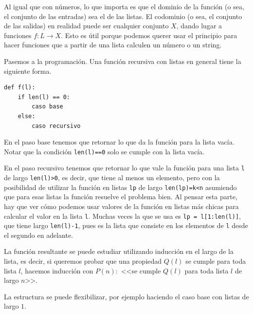 \documentclass[a4paper, 12pt]{report}
\theoremstyle{definition}
\begin{document}
Al igual que con números, lo que importa es que el dominio de la función (o sea, el conjunto de las entradas) sea el de las listas. El codominio (o sea, el conjunto de las salidas) en realidad puede ser cualquier conjunto $X$, dando lugar a funciones $f:L\to X$. Esto es útil porque podemos querer usar el principio para hacer funciones que a partir de una lista calculen un número o un string.

Pasemos a la programación. Una función recursiva con listas en general tiene la siguiente forma.

\begin{verbatim}
def f(l):
    if len(l) == 0:
        caso base
    else:
        caso recursivo
\end{verbatim}

En el paso base tenemos que retornar lo que da la función para la lista vacía. Notar que la condición {\tt len(l)==0} solo se cumple con la lista vacía.

En el paso recursivo tenemos que retornar lo que vale la función para una lista {\tt l} de largo {\tt len(l)>0}, es decir, que tiene al menos un elemento, pero con la posibilidad de utilizar la función en listas {\tt lp} de largo {\tt len(lp)=k<n} asumiendo que para esas listas la función resuelve el problema bien. Al pensar esta parte, hay que ver cómo podemos usar valores de la función en listas más chicas para calcular el valor en la lista {\tt l}. Muchas veces la que se usa es {\tt lp = l[1:len(l)]}, que tiene largo {\tt len(l)-1}, pues es la lista que consiste en los elementos de {\tt l} desde el segundo en adelante.

La función resultante se puede estudiar utilizando inducción en el largo de la lista, es decir, si queremos probar que una propiedad $Q(l)$ se cumple para toda lista $l$, hacemos inducción con $P(n):$ <<se cumple $Q(l)$ para toda lista $l$ de largo $n$>>.

La estructura se puede flexibilizar, por ejemplo haciendo el caso base con listas de largo $1$.
\end{document}
